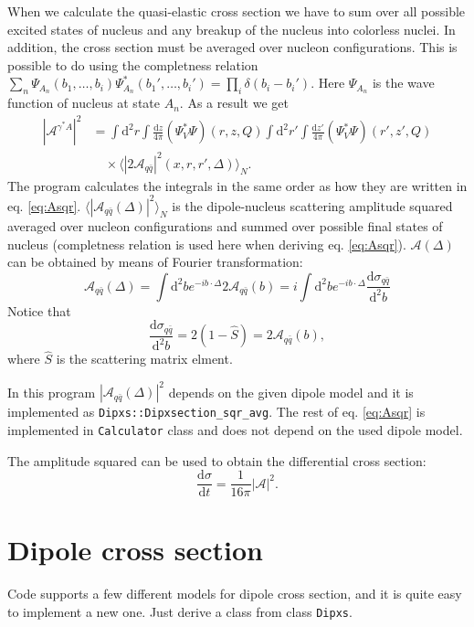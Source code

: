\documentclass[a4paper,12pt]{article}
\newcommand{\code}[1]{\texttt{#1}}
\newcommand{\der}{\mathrm{d}}
\newcommand{\A}{\mathcal{A}}
\begin{document}
When we calculate the quasi-elastic cross section we have to sum over all possible excited states of nucleus and any breakup of the nucleus into colorless nuclei. In addition, the cross section must be averaged over nucleon configurations. This is possible to do using the completness relation $\sum_n \Psi_{A_n}(b_1,\dots,b_i) \Psi_{A_n}^*(b_1',\dots,b_i') = \prod_i \delta(b_i-b_i')$. Here $\Psi_{A_n}$ is the wave function of nucleus at state $A_n$. As a result we get
\begin{equation}
\begin{split}
	\label{eq:Asqr}
	|\A^{\gamma^* A}|^2 &= \int \der^2 r \int \frac{\der z}{4\pi} (\Psi_V^*\Psi)(r,z,Q) \int \der^2 r' \int \frac{\der z'}{4\pi} (\Psi_V^*\Psi)(r',z',Q) \\
	&\quad  \times \langle|2\A_{q\bar q}|^2(x,r,r',\Delta)\rangle_N.
\end{split}
\end{equation}
The program calculates the integrals in the same order as how they are written in eq. \eqref{eq:Asqr}. $\langle|\A_{q\bar q}(\Delta)|^2\rangle_N$ is the dipole-nucleus scattering amplitude squared averaged over nucleon configurations and summed over possible final states of nucleus (completness relation is used here when deriving eq. \eqref{eq:Asqr}). $\A(\Delta)$ can be obtained by means of Fourier transformation:
\begin{equation}
	\A_{q\bar q}(\Delta) = \int \der^2 b e^{-ib\cdot \Delta} 2\A_{q\bar q}(b) = i\int \der^2 b e^{-ib\cdot \Delta} \frac{\der \sigma_{q\bar q}}{\der^2 b}
\end{equation}
Notice that
\begin{equation}
	\frac{\der \sigma_{q\bar q}}{\der^2 b} = 2(1-\hat S) = 2\A_{q\bar q}(b),
\end{equation}
where $\hat S$ is the scattering matrix elment. 

In this program $|\A_{q\bar q}(\Delta)|^2$ depends on the given dipole model and it is implemented as \code{Dipxs::Dipxsection\_sqr\_avg}. The rest of eq. \eqref{eq:Asqr} is implemented in \code{Calculator} class and does not depend on the used dipole model.

The amplitude squared can be used to obtain the differential cross section:
\begin{equation}
	\frac{\der \sigma}{\der t} = \frac{1}{16\pi} |\A|^2 .
\end{equation}

\section{Dipole cross section}
Code supports a few different models for dipole cross section, and it is quite easy to implement a new one. Just derive a class from class \code{Dipxs}.
\end{document}
